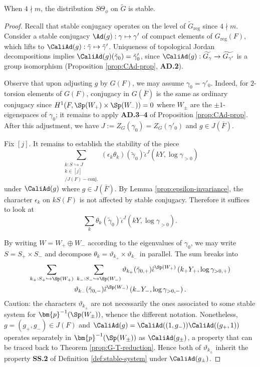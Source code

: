 \documentclass[a4paper,10pt]{article}
\begin{document}
\begin{theorem}\label{prop:stability-1}
	When $4 \nmid m$, the distribution $S\Theta_\phi$ on $\tilde{G}$ is stable.
\end{theorem}
\begin{proof}
	Recall that stable conjugacy operates on the level of $\tilde{G}_\text{reg}$ since $4 \nmid m$. Consider a stable conjugacy $\Ad(g): \gamma \mapsto \gamma'$ of compact elements of $G_\text{reg}(F)$, which lifts to $\CaliAd(g): \tilde{\gamma} \mapsto \tilde{\gamma}'$. Uniqueness of topological Jordan decompositions implies $\CaliAd(g)(\tilde{\gamma}_0) = \tilde{\gamma}'_0$, since $\CaliAd(g): \widetilde{G_\gamma} \to \widetilde{G_{\gamma'}}$ is a group isomorphism (Proposition \ref{prop:CAd-prop}, \textbf{AD.2}).
	
	Observe that upon adjusting $g$ by $G(F)$, we may assume $\gamma_0 = \gamma'_0$. Indeed, for $2$-torsion elements of $G(F)$, conjugacy in $G(\bar{F})$ is the same as ordinary conjugacy since $H^1(F, \Sp(W_+) \times \Sp(W_-)) = 0$ where $W_\pm$ are the $\pm 1$-eigenspaces of $\gamma_0$; it remains to apply \textbf{AD.3--4} of Proposition \ref{prop:CAd-prop}. After this adjustment, we have $J := Z_G(\gamma_0) = Z_G(\gamma'_0)$ and $g \in J(\bar{F})$.

	Fix $[j]$. It remains to establish the stability of the piece
	\[ \sum_{\substack{k: S \hookrightarrow J \\ k \in [j] \\ / J(F)-\text{conj}. }} (\epsilon_k \theta_k)(\tilde{\gamma}_0) \hat{\iota}^J(kY, \log \gamma_{>0}) \]
	under $\CaliAd(g)$ where $g \in J(\bar{F})$. By Lemma \ref{prop:epsilon-invariance}, the character $\epsilon_k$ on $kS(F)$ is not affected by stable conjugacy. Therefore it suffices to look at
	\[ \sum_k \theta_k (\tilde{\gamma}_0) \hat{\iota}^J(kY, \log \gamma_{>0}). \]

	By writing $W = W_+ \oplus W_-$ according to the eigenvalues of $\gamma_0$, we may write $S = S_+ \times S_-$ and decompose $\theta_k = \vartheta_{k_+} \times \vartheta_{k_-}$ in parallel. The sum breaks into
	\begin{multline*}
		\sum_{k_+: S_+ \hookrightarrow \Sp(W_+)} \; \sum_{k_-: S_- \hookrightarrow \Sp(W_-)} \vartheta_{k_+}(\tilde{\gamma}_{0,+}) \hat{\iota}^{\Sp(W_+)}\left( k_+ Y_+, \log\gamma_{>0,+} \right) \\
		\vartheta_{k_-}(\tilde{\gamma}_{0,-}) \hat{\iota}^{\Sp(W_-)}\left( k_- Y_-, \log\gamma_{>0,-} \right).
	\end{multline*}
	Caution: the characters $\vartheta_{k_\pm}$ are not necessarily the ones associated to some stable system for $\bm{p}^{-1}(\Sp(W_\pm))$, whence the different notation. Nonetheless, $g = (g_+, g_-) \in J(F)$ and $\CaliAd(g) = \CaliAd((1, g_-)) \CaliAd((g_+, 1))$ operates separately in $\bm{p}^{-1}(\Sp(W_\pm))$ as $\CaliAd(g_\pm)$, a property that can be traced back to Theorem \ref{prop:G-T-reduction}. Hence both of $\vartheta_{k_\pm}$ inherit the property \textbf{SS.2} of Definition \ref{def:stable-system} under $\CaliAd(g_\pm)$.
	

\end{proof}
\end{document}
